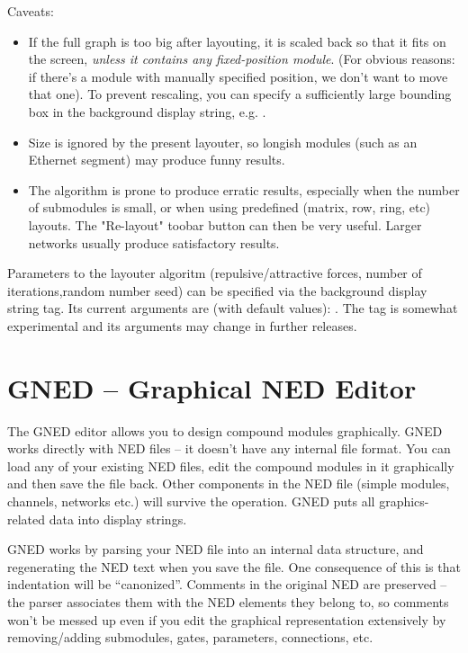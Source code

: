 Caveats:

\begin{itemize}
  \item If the full graph is too big after layouting, it is scaled
    back so that it fits on the screen, \textit{unless it contains
    any fixed-position module}. (For obvious reasons: if there's a module
    with manually specified position, we don't want to move that one).
    To prevent rescaling, you can specify a sufficiently large bounding
    box in the background display string, e.g. .
  \item Size is ignored by the present layouter, so longish modules
    (such as an Ethernet segment) may produce funny results.
  \item The algorithm is prone to produce erratic results, especially
    when the number of submodules is small, or when using predefined
    (matrix, row, ring, etc) layouts. The "Re-layout" toobar button
    can then be very useful. Larger networks usually produce
    satisfactory results.
\end{itemize}

Parameters to the layouter algoritm (repulsive/attractive forces,
number of iterations,random number seed) can be specified via the
 background display string tag. Its current arguments are
(with default values):
.
The  tag is somewhat experimental and its arguments
may change in further releases.


\section{GNED -- Graphical NED Editor}


The GNED editor allows you to design compound modules graphically.
GNED works directly with NED files -- it doesn't have any internal file
format. You can load any of your existing NED files, edit the compound
modules in it graphically and then save the file back. Other components
in the NED file (simple modules, channels, networks etc.) will
survive the operation. GNED puts all graphics-related data into
display strings.

GNED works by parsing your NED file into an internal data structure,
and regenerating the NED text when you save the file. One consequence
of this is that indentation will be ``canonized''.
Comments in the original NED are preserved -- the parser associates
them with the NED elements they belong to, so comments won't
be messed up even if you edit the graphical representation extensively
by removing/adding submodules, gates, parameters, connections, etc.

